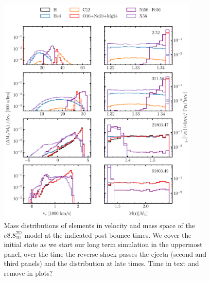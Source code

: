 \documentclass[fleqn,usenatbib]{mnras}
\newcommand{\COM}[1]{{\color{orange}#1}}
\begin{document}
\begin{figure}
 \centering
 \includegraphics[width=0.9\textwidth]{pic/e8_10_mvr_mas_4times.pdf}
 \caption{Mass distributions of elements in velocity and mass space  of the $e8.8^{\mathrm{2D}}_{10}$ model at the indicated post bounce times. We cover the initial state as we start our long term simulation in the uppermost panel, over the time the reverse shock passes the ejecta (second and third panels) and the distribution at late times. \COM{Time in text and remove in plots?}}
 \label{fig:e8 massDis 4times}
\end{figure}
%
\end{document}
